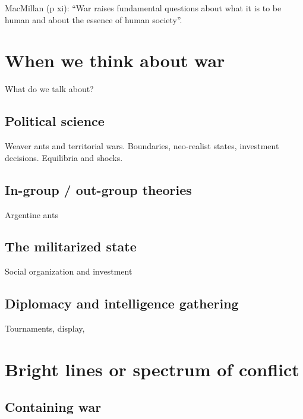 \documentclass[
  letterpaper,
  DIV=11,
  numbers=noendperiod]{scrartcl}
\begin{document}
MacMillan (p xi): ``War raises fundamental questions about what it is to
be human and about the essence of human society''.

\hypertarget{when-we-think-about-war}{%
\section{When we think about war}\label{when-we-think-about-war}}

What do we talk about?

\hypertarget{political-science}{%
\subsection{Political science}\label{political-science}}

Weaver ants and territorial wars. Boundaries, neo-realist states,
investment decisions. Equilibria and shocks.

\hypertarget{in-group-out-group-theories}{%
\subsection{In-group / out-group
theories}\label{in-group-out-group-theories}}

Argentine ants

\hypertarget{the-militarized-state}{%
\subsection{The militarized state}\label{the-militarized-state}}

Social organization and investment

\hypertarget{diplomacy-and-intelligence-gathering}{%
\subsection{Diplomacy and intelligence
gathering}\label{diplomacy-and-intelligence-gathering}}

Tournaments, display,

\hypertarget{bright-lines-or-spectrum-of-conflict}{%
\section{Bright lines or spectrum of
conflict}\label{bright-lines-or-spectrum-of-conflict}}

\hypertarget{containing-war}{%
\subsection{Containing war}\label{containing-war}}
\end{document}
